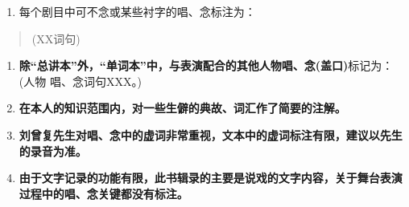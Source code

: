 \begin{enumerate}
\def\labelenumi{\arabic{enumi}.}
\setcounter{enumi}{1}
\item
  每个剧目中可不念或某些衬字的唱、念标注为：
\end{enumerate}

\begin{quote}
(XX词句)
\end{quote}

\begin{enumerate}
\def\labelenumi{\arabic{enumi}.}
\setcounter{enumi}{2}
\item
  \textbf{除``总讲本''外，``单词本''中，与表演配合的其他人物唱、念(盖口)}标记为：
  (人物 唱、念词句XXX。)
\item
  \textbf{在本人的知识范围内，对一些生僻的典故、词汇作了简要的注解。}
\item
  \textbf{刘曾复先生对唱、念中的虚词非常重视，文本中的虚词标注有限，建议以先生的录音为准。}
\item
  \textbf{由于文字记录的功能有限，此书辑录的主要是说戏的文字内容，关于舞台表演过程中的唱、念关键都没有标注。}
\end{enumerate}
